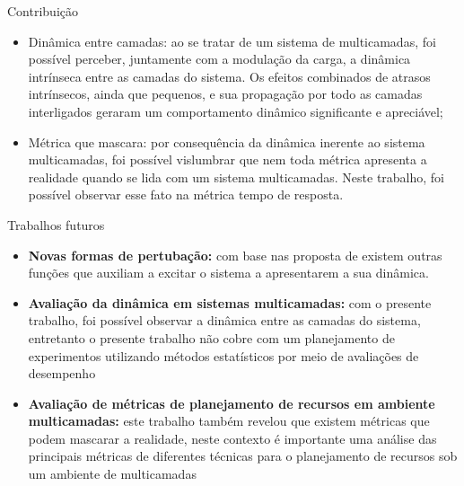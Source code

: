 \begin{frame}{Contribuição}
	\begin{itemize}
		\item Dinâmica entre camadas: ao se tratar de um sistema de multicamadas, foi possível perceber, juntamente com a modulação da carga, a dinâmica intrínseca entre as camadas do sistema. Os efeitos combinados de atrasos intrínsecos, ainda que pequenos, e sua propagação por todo as camadas interligados geraram um comportamento dinâmico significante e apreciável;
		
		\item Métrica que mascara: por consequência da dinâmica inerente ao sistema multicamadas, foi possível vislumbrar que nem toda métrica apresenta a realidade quando se lida com um sistema multicamadas. Neste trabalho, foi possível observar esse fato na métrica tempo de resposta.
	\end{itemize} 
\end{frame}

\begin{frame}{Trabalhos futuros}
	\begin{itemize}
		\item \textbf{Novas formas de pertubação:} com base nas proposta de \cite{Hellerstein2004} existem outras funções que auxiliam a excitar o sistema a apresentarem a sua dinâmica. 
		
		\item \textbf{Avaliação da dinâmica em sistemas multicamadas:} com o presente trabalho, foi possível observar a dinâmica entre as camadas do sistema, entretanto o presente trabalho não cobre com um planejamento de experimentos utilizando métodos estatísticos por meio de avaliações de desempenho
		
		\item \textbf{Avaliação de métricas de planejamento de recursos em ambiente multicamadas:} este trabalho também revelou que existem métricas que podem mascarar a realidade, neste contexto é importante uma análise das principais métricas de diferentes técnicas para o planejamento de recursos sob um ambiente de multicamadas
	\end{itemize} 
\end{frame}